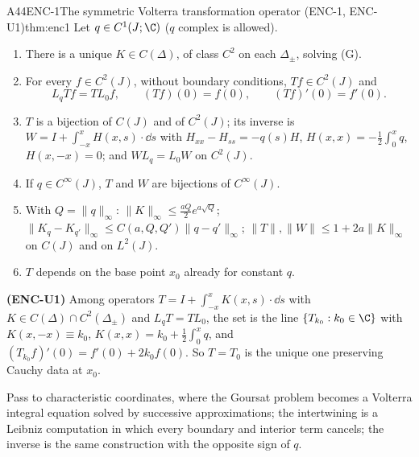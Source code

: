\begin{dimcard}{A44}{ENC-1}{The symmetric Volterra transformation operator (ENC-1, ENC-U1)}{\proved}{thm:enc1}
Let $q\in C^1(J;\C)$ ($q$ complex is allowed).
\begin{enumerate}[label=(\arabic*)]
\item There is a unique $K\in C(\Delta)$, of class $C^2$ on each $\Delta_\pm$, solving (G).
\item For every $f\in C^2(J)$, without boundary conditions, $Tf\in C^2(J)$ and
\[
L_qTf=TL_0f,\qquad (Tf)(0)=f(0),\qquad (Tf)'(0)=f'(0).
\]
\item $T$ is a bijection of $C(J)$ and of $C^2(J)$; its inverse is $W=I+\int_{-x}^xH(x,s)\cdot\dd s$ with $H_{xx}-H_{ss}=-q(s)H$, $H(x,x)=-\tfrac12\int_0^xq$, $H(x,-x)=0$; and $WL_q=L_0W$ on $C^2(J)$.
\item If $q\in C^\infty(J)$, $T$ and $W$ are bijections of $C^\infty(J)$.
\item With $Q=\|q\|_\infty$: $\|K\|_\infty\le\frac{aQ}2e^{a\sqrt Q}$; $\|K_q-K_{q'}\|_\infty\le C(a,Q,Q')\|q-q'\|_\infty$; $\|T\|,\|W\|\le1+2a\|K\|_\infty$ on $C(J)$ and on $L^2(J)$.
\item $T$ depends on the base point $x_0$ already for constant $q$.
\end{enumerate}
\textbf{(ENC-U1)} Among operators $T=I+\int_{-x}^xK(x,s)\cdot\dd s$ with $K\in C(\Delta)\cap C^2(\Delta_\pm)$ and $L_qT=TL_0$, the set is the line $\{T_{k_0}:k_0\in\C\}$ with $K(x,-x)\equiv k_0$, $K(x,x)=k_0+\frac12\int_0^xq$, and $(T_{k_0}f)'(0)=f'(0)+2k_0f(0)$. So $T=T_0$ is the unique one preserving Cauchy data at $x_0$.
\end{dimcard}

\begin{proofidea}
Pass to characteristic coordinates, where the Goursat problem becomes a Volterra integral equation solved by successive approximations; the intertwining is a Leibniz computation in which every boundary and interior term cancels; the inverse is the same construction with the opposite sign of $q$.
\end{proofidea}

